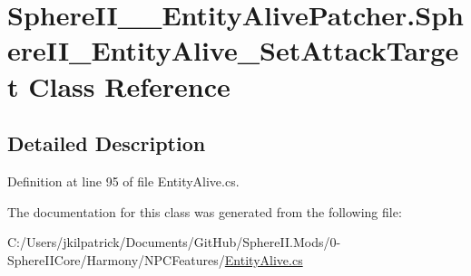 \hypertarget{class_sphere_i_i_____entity_alive_patcher_1_1_sphere_i_i___entity_alive___set_attack_target}{}\section{Sphere\+I\+I\+\_\+\+\_\+\+Entity\+Alive\+Patcher.\+Sphere\+I\+I\+\_\+\+Entity\+Alive\+\_\+\+Set\+Attack\+Target Class Reference}
\label{class_sphere_i_i_____entity_alive_patcher_1_1_sphere_i_i___entity_alive___set_attack_target}


\subsection{Detailed Description}


Definition at line 95 of file Entity\+Alive.\+cs.



The documentation for this class was generated from the following file\+:\begin{DoxyCompactItemize}
\item 
C\+:/\+Users/jkilpatrick/\+Documents/\+Git\+Hub/\+Sphere\+I\+I.\+Mods/0-\/\+Sphere\+I\+I\+Core/\+Harmony/\+N\+P\+C\+Features/\mbox{\hyperlink{_entity_alive_8cs}{Entity\+Alive.\+cs}}\end{DoxyCompactItemize}
